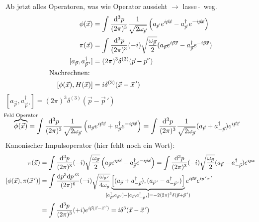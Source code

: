 Ab jetzt alles Operatoren, was wie Operator aussieht $\rightarrow$ lasse \,$\hat{}$\, weg.
	\begin{align*}
		\phi(\vec{x}) &= \int \frac{\mathrm{d}^3 p}{(2\pi)^3} 
		\frac{1}{\sqrt{2\omega_{\vec{p}}}} 
		\left(
			a_{\vec{p}}\, e^{i \vec{p} \vec{x}} -
			a^\dagger_{\vec{p}} \,e^{- i \vec{p} \vec{x}}
		\right) \\
		\pi (\vec{x}) &= \int \frac{\mathrm{d}^3 p}{(2 \pi)^3} (-i) \sqrt{\frac{\omega_{\vec{p}}}{2}} (a_{\vec{p}}e^{i \vec{p}\vec{x}} - a_{\vec{p}}^\dagger e^{-i \vec{p}\vec{x}})
		\\
		[a_{\vec{p}}, a_{\vec{p}\,'}^\dagger] &= (2\pi)^3 \delta^{(3)}(\vec{p}- \vec{p}\,') \\			
		\text{Nachrechnen: } \\ [\phi(\vec{x}), H(\vec{x})] &= i \delta^{(3)}(\vec{x}- \vec{x}\,')
	\end{align*}
$[a_{\vec{p}}, a_{\vec{p}\,'}^\dagger] = (2\pi)^3 \delta^{(3)} (\vec{p} - \vec{p}\,')$ 
	\begin{align*}
		\overbrace{\phi (\vec{x})}^{\mathclap{\text{Feld Operator}}} &= \int \frac{\diff^3 p}{(2 \pi)^3} \frac{1}{\sqrt{2 \omega_{\vec{p}}}} 
		\left(
			a_{\vec{p}} e^{i \vec{p} \vec{x}} + a_{\vec{p}}^\dagger e^{-i\vec{p} \vec{x}}
		\right) 
		= \int \frac{\diff^3 p}{(2\pi)^3} \frac{1}{\sqrt{2 \omega_{\vec{p}}}} (a_{\vec{p}} + a_{-\vec{p}}^\dagger) e^{i \vec{p} \vec{x}}
	\end{align*}
Kanonischer Impulsoperator (hier fehlt noch ein Wort):
	\begin{align*}
		\pi (\vec{x}) &= \int \frac{\diff^3 p}{(2\pi)^3} (-i) \sqrt{\frac{\omega_{\vec{p}}}{2}} 
		\left(
			a_{\vec{p}} e^{i\vec{p} \vec{x}} - a^\dagger_{\vec{p}} e^{-i\vec{p} \vec{x}}
		\right) 
		= \int \frac{\diff^3 p}{(2\pi)^3} (-i) \sqrt{\frac{\omega_{\vec{p}}}{2}} 
		(a_{\vec{p}} - a_{-\vec{p}}^\dagger) e^{ipx} \\
		[\phi(\vec{x}), \pi(\vec{x}\,')] &=
		\int \frac{\diff p^3 \diff p\,'^3}{(2\pi)^6} (-i) \sqrt{\frac{\omega_{p\,'}}{4 \omega_p}} 
		\underbrace{
		\left[
			(a_{\vec{p}} + a_{-\vec{p}}^\dagger), (a_{\vec{p}\,'} - a_{-\vec{p}\,'}^\dagger)
		\right]}_{\mathclap{
				[a_{\vec{p}}^\dagger, a_{\vec{p}\,'}] - [a_{\vec{p}}, a_{-\vec{p}\,'}^\dagger] = -2 (2\pi)^3 \delta (\vec{p}+\vec{p}\,')
			}}
		e^{i\vec{p}\vec{x}} e^{i p\,' x\,'} \\
		&= \int \frac{\diff^3 p}{(2\pi)^3} (+i) e^{i \vec{p} (\vec{x}- \vec{x}\,')} = 
		i\delta^3(\vec{x}- \vec{x}\,')
	\end{align*}
